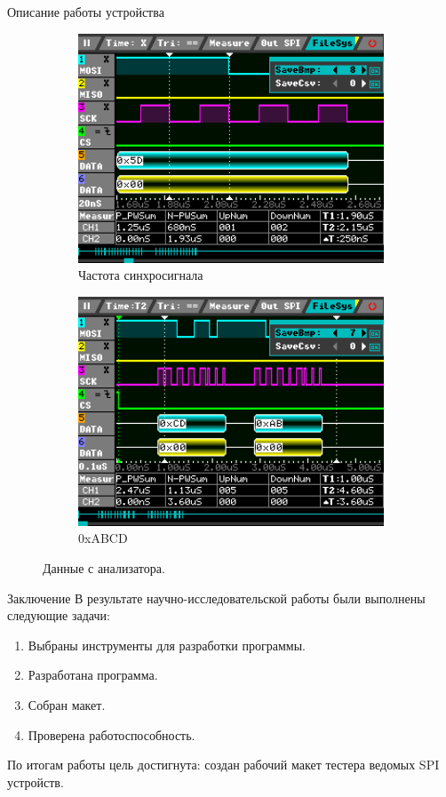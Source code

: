 \documentclass[10pt]{beamer}
\begin{document}
\begin{frame}{Описание работы устройства}
\begin{figure}
\centering
\begin{subfigure}[t]{0.45\textwidth}
\includegraphics[width=1\textwidth]{testfreq}
\caption{Частота синхросигнала}
\end{subfigure}
\hfill     
\begin{subfigure}[t]{0.45\textwidth}
\includegraphics[width=1\textwidth]{test2}
\caption{0xABCD}
\end{subfigure}    
\caption{Данные с анализатора.}
\end{figure}
\end{frame}

\begin{frame}{Заключение}
	В результате научно-исследовательской работы были выполнены следующие задачи:
  \begin{enumerate}
  \item Выбраны инструменты для разработки программы.
  \item Разработана программа.
  \item Собран макет.
  \item Проверена работоспособность. 
  \end{enumerate}
  
 	По итогам работы цель достигнута: создан рабочий макет тестера ведомых SPI устройств.
\end{frame}
\end{document}
